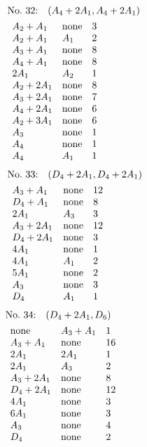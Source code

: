 \begin{align*}
&\hbox to 4cm {\textrm{No.~32:}\quad$(A_{4}+2A_{1}, A_{4}+2A_{1})$\hss}\\ 
&\begin{array}{lll}
A_{2}+A_{1} & \none & 3\\
A_{2}+A_{1} & A_{1} & 2\\
A_{3}+A_{1} & \none & 8\\
A_{4}+A_{1} & \none & 8\\
2A_{1} & A_{2} & 1\\
A_{2}+2A_{1} & \none & 8\\
A_{3}+2A_{1} & \none & 7\\
A_{4}+2A_{1} & \none & 6\\
A_{2}+3A_{1} & \none & 6\\
A_{3} & \none & 1\\
A_{4} & \none & 1\\
A_{4} & A_{1} & 1\\
\end{array}
\end{align*}
%
%
\begin{align*}
&\hbox to 4cm {\textrm{No.~33:}\quad$(D_{4}+2A_{1}, D_{4}+2A_{1})$\hss}\\ 
&\begin{array}{lll}
A_{3}+A_{1} & \none & 12\\
D_{4}+A_{1} & \none & 8\\
2A_{1} & A_{3} & 3\\
A_{3}+2A_{1} & \none & 12\\
D_{4}+2A_{1} & \none & 3\\
4A_{1} & \none & 1\\
4A_{1} & A_{1} & 2\\
5A_{1} & \none & 2\\
A_{3} & \none & 3\\
D_{4} & A_{1} & 1\\
\end{array}
\end{align*}
%
%
\begin{align*}
&\hbox to 4cm {\textrm{No.~34:}\quad$(D_{4}+2A_{1}, D_{6})$\hss}\\ 
&\begin{array}{lll}
\none & A_{3}+A_{1} & 1\\
A_{3}+A_{1} & \none & 16\\
2A_{1} & 2A_{1} & 1\\
2A_{1} & A_{3} & 2\\
A_{3}+2A_{1} & \none & 8\\
D_{4}+2A_{1} & \none & 12\\
4A_{1} & \none & 3\\
6A_{1} & \none & 3\\
A_{3} & \none & 4\\
D_{4} & \none & 2\\
\end{array}
\end{align*}
